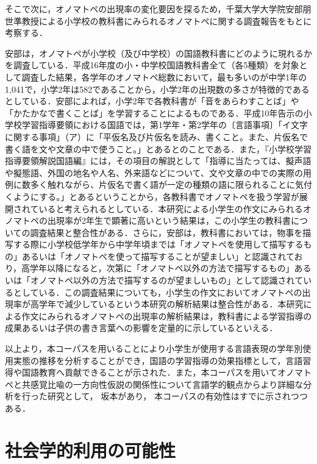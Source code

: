 \documentclass[japanese]{jnlp_1.4}
\begin{document}
そこで次に，オノマトペの出現率の変化要因を探るため，千葉大学大学院安部朋世準教授による小学校の教科書にみられるオノマトペに関する調査報告\cite[\texttt{http://www.u-gakugei.ac.jp/} \break
\texttt{\~{}taiken/houkoku013.pdf}]{Web_Abe}をもとに考察する．

安部は，オノマトペが小学校（及び中学校）の国語教科書にどのように現れるかを調査している．平成16年度の小・中学校国語教科書全て（各5種類）を対象として調査した結果，各学年のオノマトペ総数において，最も多いのが中学1年の1,041で，小学2年は582であることから，小学2年の出現数の多さが特徴的であるとしている．安部によれば，小学2年で各教科書が「音をあらわすことば」や「かたかなで書くことば」を学習することによるものである．平成10年告示の小学校学習指導要領における国語では，第1学年・第2学年の〔言語事項〕「イ文字に関する事項」（ア）に「平仮名及び片仮名を読み、書くこと。また、片仮名で書く語を文や文章の中で使うこと。」とあるとのことである．また，『小学校学習指導要領解説国語編』には，その項目の解説として「指導に当たっては、擬声語や擬態語、外国の地名や人名、外来語などについて、文や文章の中での実際の用例に数多く触れながら、片仮名で書く語が一定の種類の語に限られることに気付くようにする。」とあるということから，各教科書でオノマトペを扱う学習が展開されていると考えられるとしている．本研究による小学生の作文にみられるオノマトペの出現率が2年生で顕著に高いという結果は，この小学生の教科書についての調査結果と整合性がある．さらに，安部は，教科書においては，物事を描写する際に小学校低学年から中学年頃までは「オノマトペを使用して描写するもの」あるいは「オノマトペを使って描写することが望ましい」と認識されており，高学年以降になると，次第に「オノマトペ以外の方法で描写するもの」あるいは「オノマトペ以外の方法で描写するのが望ましいもの」として認識されているとしている．この調査結果についても，小学生の作文においてオノマトペの出現率が高学年で減少しているという本研究の解析結果は整合性がある．本研究による作文にみられるオノマトペの出現率の解析結果は，教科書による学習指導の成果あるいは子供の書き言葉への影響を定量的に示しているといえる．

以上より，本コーパスを用いることにより小学生が使用する言語表現の学年別使用実態の推移を分析することができ，国語の学習指導の効果指標として，言語習得や国語教育へ貢献できることが示された．また，本コーパスを用いてオノマトペと共感覚比喩の一方向性仮説の関係性について言語学的観点からより詳細な分析を行った研究として，
    坂本\cite{Art_Sak}があり，
本コーパスの有効性はすでに示されつつある．


\section{社会学的利用の可能性}
\end{document}
